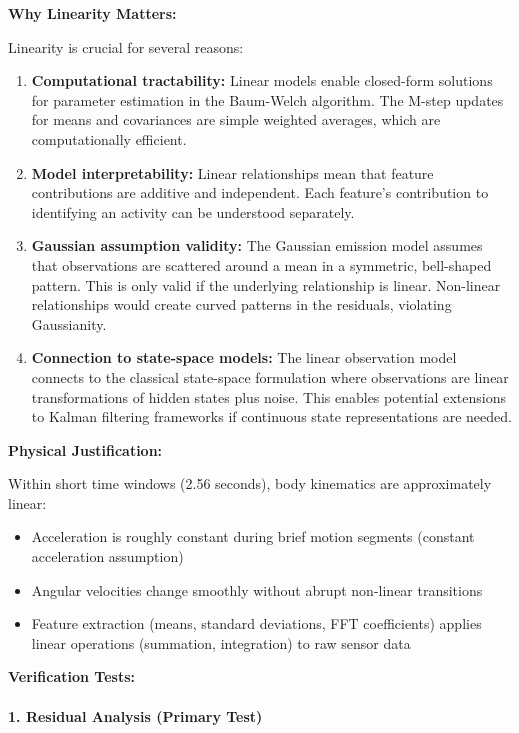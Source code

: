 \documentclass[11pt,a4paper]{article}
\begin{document}
\textbf{Why Linearity Matters:}

Linearity is crucial for several reasons:
\begin{enumerate}[leftmargin=*]
    \item \textbf{Computational tractability:} Linear models enable closed-form solutions for parameter estimation in the Baum-Welch algorithm. The M-step updates for means and covariances are simple weighted averages, which are computationally efficient.
    
    \item \textbf{Model interpretability:} Linear relationships mean that feature contributions are additive and independent. Each feature's contribution to identifying an activity can be understood separately.
    
    \item \textbf{Gaussian assumption validity:} The Gaussian emission model assumes that observations are scattered around a mean in a symmetric, bell-shaped pattern. This is only valid if the underlying relationship is linear. Non-linear relationships would create curved patterns in the residuals, violating Gaussianity.
    
    \item \textbf{Connection to state-space models:} The linear observation model connects to the classical state-space formulation where observations are linear transformations of hidden states plus noise. This enables potential extensions to Kalman filtering frameworks if continuous state representations are needed.
\end{enumerate}

\textbf{Physical Justification:}

Within short time windows (2.56 seconds), body kinematics are approximately linear:
\begin{itemize}[leftmargin=*]
    \item Acceleration is roughly constant during brief motion segments (constant acceleration assumption)
    \item Angular velocities change smoothly without abrupt non-linear transitions
    \item Feature extraction (means, standard deviations, FFT coefficients) applies linear operations (summation, integration) to raw sensor data
\end{itemize}

\textbf{Verification Tests:}

\paragraph{1. Residual Analysis (Primary Test)}
\end{document}
